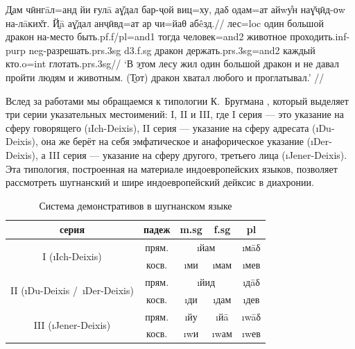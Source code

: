 \begingl
\gla \b{Дам} чӣнгāл=анд йи ғулā аɣ̌дал бар-ҷой виц=ху, даδ одам=ат айwу̊н наɣ̌ҷӣд-оw на-лāких̌т. \b{Йā} аɣ̌дал анҷӣвд=ат ар чи=йаθ абêзд.//
 лес={\sc loc} один большой дракон на-место быть.{\sc pf.f/pl=and1} тогда человек={\sc and2} животное проходить.{\sc inf-purp} {\sc neg}-разрешать.{\sc prs.3sg} {\sc d3.f.sg} дракон держать.{\sc prs.3sg=and2} каждый кто.{\sc o=int} глотать.{\sc prs.3sg}//
\glft ‘В \b{этом} лесу жил один большой дракон и не давал пройти людям и животным. (\b{Тот}) дракон хватал любого и проглатывал.’ //
\endgl \xe

Вслед за работами \parencites[]{belikov1972}[]{yusufbekov1998}[]{edelman1976} мы обращаемся к типологии К.~Бругмана \parencite{brugmann1904}, который выделяет три серии указательных местоимений: I, II и III, где I серия — это указание на сферу говорящего (\i{Ich-Deixis}), II серия — указание на сферу адресата (\i{Du-Deixis}), она же берёт на себя эмфатическое и анафорическое указание (\i{Der-Deixis}), а III серия — указание на сферу другого, третьего лица (\i{Jener-Deixis}). Эта типология, построенная на материале индоевропейских языков, позволяет рассмотреть шугнанский и шире индоевропейский дейксис в диахронии.

\begin{table}
 \centering
 \caption{Система демонстративов в шугнанском языке \parencite[12]{yusufbekov1998}}
 \smallskip
 \label{tab:dem1}
 \begin{tabular}{c|c|ccc} \toprule
 серия & падеж & {\sc m.sg} & {\sc f.sg} & {\sc pl} \\ \midrule
 \multirow{2}{*}{I (\i{Ich-Deixis})} & прям. & \multicolumn{2}{c}{\i{йам}} & \i{мāδ} \\
 & косв. & \i{ми} & \i{мам} & \i{мев} \\ \midrule
 \multirow{2}{*}{II (\i{Du-Deixis} /~\i{Der-Deixis})} & прям. & \multicolumn{2}{c}{\i{йид}} & \i{дāδ} \\
 & косв. & \i{ди} & \i{дам} & \i{дев} \\ \midrule
 \multirow{2}{*}{III (\i{Jener-Deixis})} & прям. & \i{йу} & \i{йā} & \i{wāδ} \\
 & косв. & \i{wи} & \i{wам} & \i{wев} \\ \bottomrule
 \end{tabular}
\end{table}

